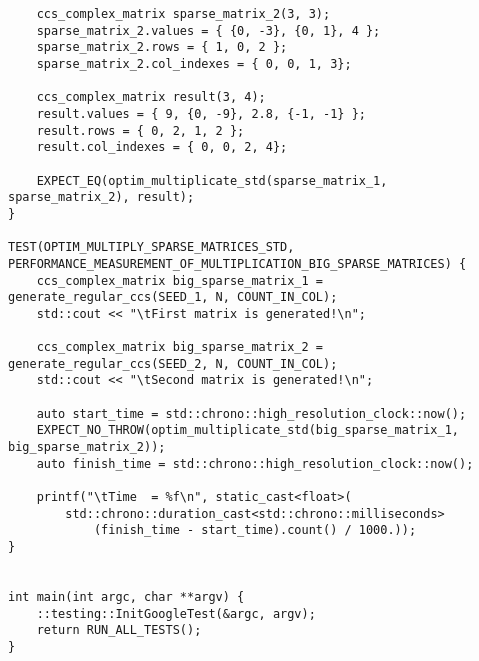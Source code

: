 \documentclass{report}
\begin{document}
\begin{lstlisting}
    ccs_complex_matrix sparse_matrix_2(3, 3);
    sparse_matrix_2.values = { {0, -3}, {0, 1}, 4 };
    sparse_matrix_2.rows = { 1, 0, 2 };
    sparse_matrix_2.col_indexes = { 0, 0, 1, 3};

    ccs_complex_matrix result(3, 4);
    result.values = { 9, {0, -9}, 2.8, {-1, -1} };
    result.rows = { 0, 2, 1, 2 };
    result.col_indexes = { 0, 0, 2, 4};

    EXPECT_EQ(optim_multiplicate_std(sparse_matrix_1, sparse_matrix_2), result);
}

TEST(OPTIM_MULTIPLY_SPARSE_MATRICES_STD, PERFORMANCE_MEASUREMENT_OF_MULTIPLICATION_BIG_SPARSE_MATRICES) {
    ccs_complex_matrix big_sparse_matrix_1 = generate_regular_ccs(SEED_1, N, COUNT_IN_COL);
    std::cout << "\tFirst matrix is generated!\n";

    ccs_complex_matrix big_sparse_matrix_2 = generate_regular_ccs(SEED_2, N, COUNT_IN_COL);
    std::cout << "\tSecond matrix is generated!\n";

    auto start_time = std::chrono::high_resolution_clock::now();
    EXPECT_NO_THROW(optim_multiplicate_std(big_sparse_matrix_1, big_sparse_matrix_2));
    auto finish_time = std::chrono::high_resolution_clock::now();

    printf("\tTime  = %f\n", static_cast<float>(
        std::chrono::duration_cast<std::chrono::milliseconds>
            (finish_time - start_time).count() / 1000.));
}


int main(int argc, char **argv) {
    ::testing::InitGoogleTest(&argc, argv);
    return RUN_ALL_TESTS();
}
	\end{lstlisting}
\end{document}
